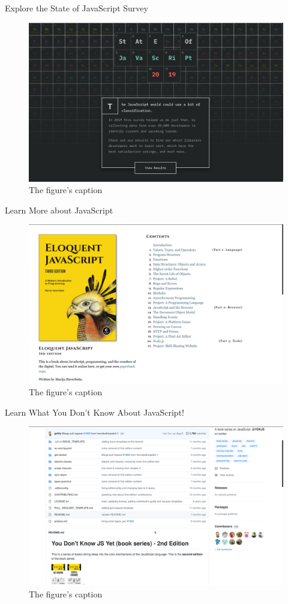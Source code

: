 \documentclass[14pt,aspectratio=169]{beamer}
\begin{document}
%
\begin{frame}{Explore the State of JavaScript Survey}
  \begin{figure}
    \centering
    \includegraphics[scale=.080]{images/stateofjs.png}
    \caption{The figure's caption}
  \end{figure}
\end{frame}

%
\begin{frame}{Learn More about JavaScript}
  \begin{figure}
    \centering
    \includegraphics[scale=.080]{images/eloquent-javascript.png}
    \caption{The figure's caption}
  \end{figure}
\end{frame}

%
\begin{frame}{Learn What You Don't Know About JavaScript!}
  \begin{figure}
    \centering
    \includegraphics[scale=.080]{images/dont-know-javascript.png}
    \caption{The figure's caption}
  \end{figure}
\end{frame}
\end{document}
